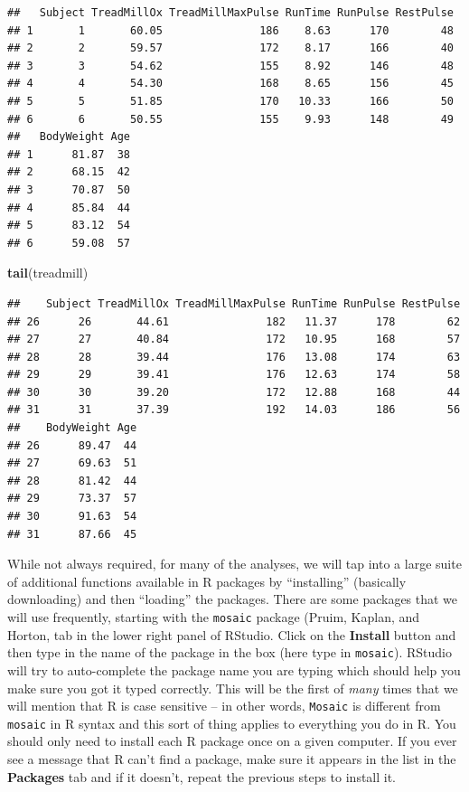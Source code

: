 \documentclass[]{article}
\newenvironment{Shaded}{\begin{snugshade}}{\end{snugshade}}
\newcommand{\KeywordTok}[1]{\textcolor[rgb]{0.13,0.29,0.53}{\textbf{{#1}}}}
\newcommand{\NormalTok}[1]{{#1}}
\begin{document}
\begin{verbatim}
##   Subject TreadMillOx TreadMillMaxPulse RunTime RunPulse RestPulse
## 1       1       60.05               186    8.63      170        48
## 2       2       59.57               172    8.17      166        40
## 3       3       54.62               155    8.92      146        48
## 4       4       54.30               168    8.65      156        45
## 5       5       51.85               170   10.33      166        50
## 6       6       50.55               155    9.93      148        49
##   BodyWeight Age
## 1      81.87  38
## 2      68.15  42
## 3      70.87  50
## 4      85.84  44
## 5      83.12  54
## 6      59.08  57
\end{verbatim}

\begin{Shaded}
\begin{Highlighting}[]
\KeywordTok{tail}\NormalTok{(treadmill)}
\end{Highlighting}
\end{Shaded}

\begin{verbatim}
##    Subject TreadMillOx TreadMillMaxPulse RunTime RunPulse RestPulse
## 26      26       44.61               182   11.37      178        62
## 27      27       40.84               172   10.95      168        57
## 28      28       39.44               176   13.08      174        63
## 29      29       39.41               176   12.63      174        58
## 30      30       39.20               172   12.88      168        44
## 31      31       37.39               192   14.03      186        56
##    BodyWeight Age
## 26      89.47  44
## 27      69.63  51
## 28      81.42  44
## 29      73.37  57
## 30      91.63  54
## 31      87.66  45
\end{verbatim}

While not always required, for many of the analyses, we will tap into a
large suite of additional functions available in R packages by
``installing'' (basically downloading) and then ``loading'' the
packages. There are some packages that we will use frequently, starting
with the \texttt{mosaic} package (Pruim, Kaplan, and Horton, tab in the
lower right panel of RStudio. Click on the \textbf{Install} button and
then type in the name of the package in the box (here type in
\texttt{mosaic}). RStudio will try to auto-complete the package name you
are typing which should help you make sure you got it typed correctly.
This will be the first of \emph{many} times that we will mention that R
is case sensitive -- in other words, \texttt{Mosaic} is different from
\texttt{mosaic} in R syntax and this sort of thing applies to everything
you do in R. You should only need to install each R package once on a
given computer. If you ever see a message that R can't find a package,
make sure it appears in the list in the \textbf{Packages} tab and if it
doesn't, repeat the previous steps to install it.
\end{document}
